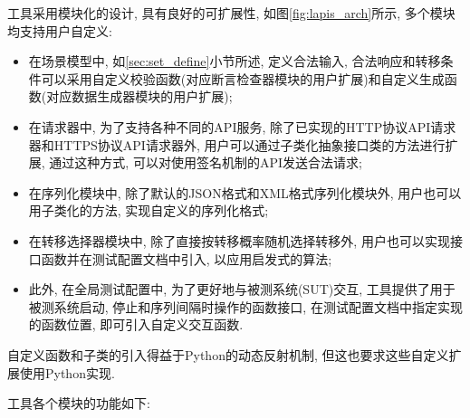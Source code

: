 	    工具采用模块化的设计, 具有良好的可扩展性, 如图\ref{fig:lapis_arch}所示, 多个模块均支持用户自定义:
	    \begin{itemize}
	        \item 在场景模型中, 如\ref{sec:set_define}小节所述, 定义合法输入, 合法响应和转移条件可以采用自定义校验函数(对应断言检查器模块的用户扩展)和自定义生成函数(对应数据生成器模块的用户扩展);
	        \item 在请求器中, 为了支持各种不同的API服务, 除了已实现的HTTP协议API请求器和HTTPS协议API请求器外, 用户可以通过子类化抽象接口类的方法进行扩展, 通过这种方式, 可以对使用签名机制的API发送合法请求;
	        \item 在序列化模块中, 除了默认的JSON格式和XML格式序列化模块外, 用户也可以用子类化的方法, 实现自定义的序列化格式;
	        \item 在转移选择器模块中, 除了直接按转移概率随机选择转移外, 用户也可以实现接口函数并在测试配置文档中引入, 以应用启发式的算法;
	        \item 此外, 在全局测试配置中, 为了更好地与被测系统(SUT)交互, 工具提供了用于被测系统启动, 停止和序列间隔时操作的函数接口, 在测试配置文档中指定实现的函数位置, 即可引入自定义交互函数.
	    \end{itemize}  
	    自定义函数和子类的引入得益于Python的动态反射机制, 但这也要求这些自定义扩展使用Python实现.
	    
	    工具各个模块的功能如下:
	    
